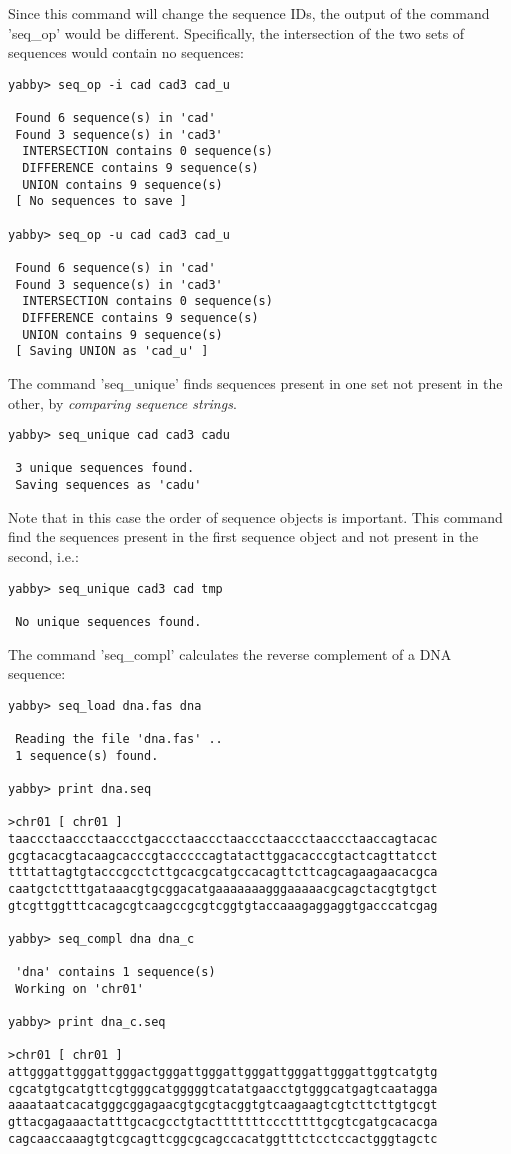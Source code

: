 Since this command will change the sequence IDs, the output
of the command 'seq\_op' would be different. Specifically,
the intersection of the two sets of sequences would contain
no sequences:

\begin{verbatim}
yabby> seq_op -i cad cad3 cad_u

 Found 6 sequence(s) in 'cad'
 Found 3 sequence(s) in 'cad3'
  INTERSECTION contains 0 sequence(s)
  DIFFERENCE contains 9 sequence(s)
  UNION contains 9 sequence(s)
 [ No sequences to save ]

yabby> seq_op -u cad cad3 cad_u

 Found 6 sequence(s) in 'cad'
 Found 3 sequence(s) in 'cad3'
  INTERSECTION contains 0 sequence(s)
  DIFFERENCE contains 9 sequence(s)
  UNION contains 9 sequence(s)
 [ Saving UNION as 'cad_u' ]
\end{verbatim}


The command 'seq\_unique' finds sequences present in one set
not present in the other, by {\em comparing sequence strings}.

\begin{verbatim}
yabby> seq_unique cad cad3 cadu

 3 unique sequences found.
 Saving sequences as 'cadu'
\end{verbatim}

Note that in this case the order of sequence objects is important.
This command find the sequences present in the first sequence
object and not present in the second, i.e.:

\begin{verbatim}
yabby> seq_unique cad3 cad tmp

 No unique sequences found.
\end{verbatim}


The command 'seq\_compl' calculates the reverse complement of
a DNA sequence:

\begin{verbatim}
yabby> seq_load dna.fas dna

 Reading the file 'dna.fas' ..
 1 sequence(s) found.

yabby> print dna.seq

>chr01 [ chr01 ]
taaccctaaccctaaccctgaccctaaccctaaccctaaccctaaccctaaccagtacac
gcgtacacgtacaagcacccgtacccccagtatacttggacacccgtactcagttatcct
ttttattagtgtacccgcctcttgcacgcatgccacagttcttcagcagaagaacacgca
caatgctctttgataaacgtgcggacatgaaaaaaagggaaaaacgcagctacgtgtgct
gtcgttggtttcacagcgtcaagccgcgtcggtgtaccaaagaggaggtgacccatcgag

yabby> seq_compl dna dna_c

 'dna' contains 1 sequence(s)
 Working on 'chr01'

yabby> print dna_c.seq

>chr01 [ chr01 ]
attgggattgggattgggactgggattgggattgggattgggattgggattggtcatgtg
cgcatgtgcatgttcgtgggcatgggggtcatatgaacctgtgggcatgagtcaatagga
aaaataatcacatgggcggagaacgtgcgtacggtgtcaagaagtcgtcttcttgtgcgt
gttacgagaaactatttgcacgcctgtactttttttccctttttgcgtcgatgcacacga
cagcaaccaaagtgtcgcagttcggcgcagccacatggtttctcctccactgggtagctc
\end{verbatim}

